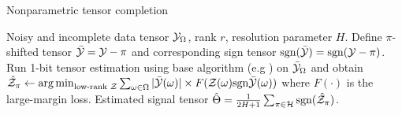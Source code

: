 \documentclass[10pt]{article}
\def\sign{\textup{sgn}}
\begin{document}
\begin{algorithm}[h!]
  \caption{Nonparametric tensor completion}\label{alg:tensorT}
 \begin{algorithmic}[1] 
\INPUT Noisy and incomplete data tensor $\mathcal{Y}_\Omega$, rank $r$, resolution parameter $H$.
\State Define $\pi$-shifted tensor $\bar {\mathcal{Y}}=\mathcal{Y}-\pi$ and corresponding sign tensor $\sign(\bar \tY)=\sign(\tY-\pi)$. 
\State Run 1-bit tensor estimation using base algorithm (e.g \citep{ghadermarzy2018learning,wang2018learning,hong2020generalized,alquier2019estimation}) on $\bar {\mathcal{Y}}_\Omega$ and obtain $\hat \tZ_\pi\leftarrow \argmin_{\text{low-rank }\tZ}\sum_{\omega\in \Omega} |\bar \tY(\omega)|\times F(\tZ(\omega)\sign\bar \tY(\omega))$ where $F(\cdot)$ is the large-margin loss.
\EndFor
\OUTPUT Estimated signal tensor $\hat \Theta={1\over 2H+1}\sum_{\pi \in \tH}\sign(\hat \tZ_\pi)$.
    \end{algorithmic}
\end{algorithm}
\end{document}
